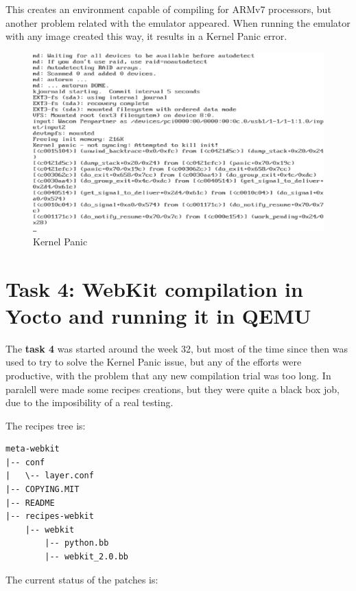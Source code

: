 \documentclass[a4paper,11pt,openany]{report}
\begin{document}
This creates an environment capable of compiling for ARMv7 processors, but another problem related with the emulator appeared. When running the emulator with any image created this way, it results in a Kernel Panic error.

\begin{figure}[hbtp]
\centering
\includegraphics[scale=0.9]{kernel_panic.eps}
\caption{Kernel Panic}
\end{figure}

\section{Task 4: WebKit compilation in Yocto and running it in QEMU}
The \textbf{task 4} was started around the week 32, but most of the time since then was used to try to solve the Kernel Panic issue, but any of the efforts were productive, with the problem that any new compilation trial was too long. In paralell were made some recipes creations, but they were quite a black box job, due to the imposibility of a real testing.

The recipes tree is:
\begin{verbatim}
meta-webkit
|-- conf
|   \-- layer.conf
|-- COPYING.MIT
|-- README
|-- recipes-webkit
    |-- webkit
        |-- python.bb
        |-- webkit_2.0.bb
\end{verbatim}

The current status of the patches is:
\end{document}
